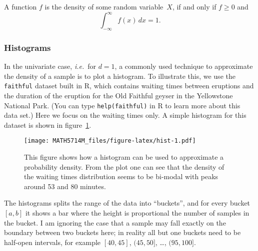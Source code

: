 \documentclass[
  a4paper,
]{article}
\newenvironment{Shaded}{\begin{snugshade}}{\end{snugshade}}
\newcommand{\AttributeTok}[1]{\textcolor[rgb]{0.77,0.63,0.00}{#1}}
\newcommand{\ConstantTok}[1]{\textcolor[rgb]{0.00,0.00,0.00}{#1}}
\newcommand{\FunctionTok}[1]{\textcolor[rgb]{0.00,0.00,0.00}{#1}}
\newcommand{\NormalTok}[1]{#1}
\newcommand{\OtherTok}[1]{\textcolor[rgb]{0.56,0.35,0.01}{#1}}
\newcommand{\SpecialCharTok}[1]{\textcolor[rgb]{0.00,0.00,0.00}{#1}}
\newcommand{\StringTok}[1]{\textcolor[rgb]{0.31,0.60,0.02}{#1}}
\theoremstyle{definition}
\theoremstyle{definition}
\theoremstyle{definition}
\theoremstyle{definition}
\theoremstyle{remark}
\begin{document}
A function \(f\) is the density of some random variable~\(X\),
if and only if \(f \geq 0\) and
\begin{equation*}
  \int_{-\infty}^\infty f(x) \,dx = 1.
\end{equation*}

\hypertarget{histograms-1}{%
\subsubsection{Histograms}\label{histograms-1}}

In the univariate case, \emph{i.e.}~for \(d = 1\), a commonly used technique
to approximate the density of a sample is to plot a histogram. To
illustrate this, we use the \texttt{faithful} dataset built in R, which
contains waiting times between eruptions and the duration of the
eruption for the Old Faithful geyser in the Yellowstone National Park.
(You can type \texttt{help(faithful)} in R to learn more about this data
set.) Here we focus on the waiting times only. A simple histogram
for this dataset is shown in figure~\ref{fig:hist}.



\begin{Shaded}
\end{Shaded}

\begin{figure}
\centering
\texttt{[image: MATH5714M\_files/figure-latex/hist-1.pdf]}
\caption{\label{fig:hist}This figure shows how a histogram can be used to approximate a probability density. From the plot one can see that the density of the waiting times distribution seems to be bi-modal with peaks around 53 and 80 minutes.}
\end{figure}

The histograms splits the range of the data into ``buckets'', and for
every bucket \([a, b]\) it shows a bar where the height is proportional
the number of samples in the bucket. I am ignoring the case that a
sample may fall exactly on the boundary between two buckets here; in
reality all but one buckets need to be half-open intervals, for
example \([40, 45]\), \((45, 50]\), \ldots, \((95, 100]\).
\end{document}
